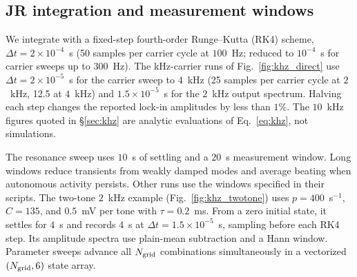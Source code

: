 \documentclass[11pt,a4paper]{article}
\providecommand{\DIFaddbegin}{} %
\begin{document}
\subsection{JR integration and measurement windows}\label{supp:jr-runs}
We integrate with a fixed-step fourth-order Runge--Kutta (RK4) scheme,
$\Delta t=2\times10^{-4}$~s (50 samples per carrier cycle at $100$~Hz; reduced to
$10^{-4}$~s for carrier sweeps up to $300$~Hz). The kHz-carrier runs of
Fig.~\ref{fig:khz_direct} use $\Delta t=2\times10^{-5}$~s for the carrier sweep to
$4$~kHz (25 samples per carrier cycle at $2$~kHz, 12.5 at $4$~kHz) and
$1.5\times10^{-5}$~s for the $2$~kHz output spectrum. Halving each step changes the
reported lock-in amplitudes by less than $1\%$. The $10$~kHz figures quoted in
\S\ref{sec:khz} are analytic evaluations of Eq.~\eqref{eq:khz}, not simulations.

The resonance sweep uses $10$~s of settling and a $20$~s
measurement window. Long windows reduce transients from weakly damped modes and
average beating when autonomous activity persists. Other runs use the windows
specified in their scripts.
The two-tone $2$~kHz example (Fig.~\ref{fig:khz_twotone}) uses $p=400$~s$^{-1}$,
$C=135$, and $0.5$~mV per tone with $\tau=0.2$~ms. From a zero initial state,
it settles for $4$~s and records $4$~s at $\Delta t=1.5\times10^{-5}$~s,
sampling before each RK4 step. Its amplitude spectra use plain-mean subtraction
and a Hann window. Parameter sweeps advance all $N_{\rm grid}$ combinations simultaneously
in a vectorized $(N_{\rm grid},6)$ state array.

\fi
\DIFaddbegin
\end{document}
